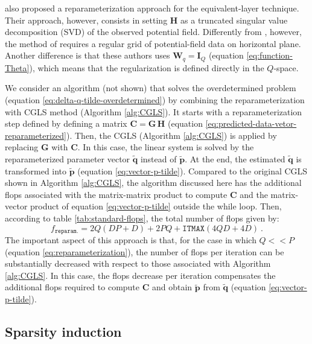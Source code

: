 \documentclass[utf8]{FrontiersinHarvard} %
\begin{document}
	\cite{mendonca2020} also proposed a reparameterization approach for the equivalent-layer technique.
	Their approach, however, consists in setting $\mathbf{H}$ as a truncated singular value decomposition
	(SVD) \cite[e.g.,][p. 55]{aster_etal2019} of the observed potential field. 
	Differently from \cite{oliveirajr-etal2013}, however, the method of \cite{mendonca2020} requires 
	a regular grid of potential-field data on horizontal plane.
	Another difference is that these authors uses $\mathbf{W}_{q} = \mathbf{I}_{Q}$ (equation \ref{eq:function-Theta}),
	which means that the regularization is defined directly in the $Q$-space.
	
	We consider an algorithm (not shown) that solves the overdetermined problem (equation \ref{eq:delta-q-tilde-overdetermined}) by
	combining the reparameterization with CGLS method (Algorithm \ref{alg:CGLS}).
	It starts with a reparameterization step defined by defining a matrix $\mathbf{C} = \mathbf{G \, H}$ 
	(equation \ref{eq:predicted-data-vetor-reparameterized}).
	Then, the CGLS (Algorithm \ref{alg:CGLS}) is applied by replacing $\mathbf{G}$ with $\mathbf{C}$.
	In this case, the linear system is solved by the reparameterized parameter vector $\tilde{\mathbf{q}}$ instead of
	$\tilde{\mathbf{p}}$. At the end, the estimated $\tilde{\mathbf{q}}$ is transformed into $\tilde{\mathbf{p}}$ 
	(equation \ref{eq:vector-p-tilde}).
	Compared to the original CGLS shown in Algorithm \ref{alg:CGLS}, the algorithm discussed here has the additional flops
	associated with the matrix-matrix product to compute $\mathbf{C}$ and the matrix-vector product of equation \ref{eq:vector-p-tilde} outside the while loop.
	Then, according to table \ref{tab:standard-flops}, the total number of flops given by:
	\begin{equation}
		f_{\mathtt{reparam.}} = 2Q(DP+D) + 2PQ + \mathtt{ITMAX} \left( 4QD + 4D \right) \: .
		\label{flops:reparameterization-cgls}
	\end{equation}
	The important aspect of this approach is that, for the case in which $Q << P$ (equation \ref{eq:reparameterization}),
	the number of flops per iteration can be substantially decreased with respect to those associated with Algorithm \ref{alg:CGLS}.
	In this case, the flops decrease per iteration compensates the additional flops required to compute $\mathbf{C}$ and 
	obtain $\tilde{\mathbf{p}}$ from $\tilde{\mathbf{q}}$ (equation \ref{eq:vector-p-tilde}).
	
	\subsection{Sparsity induction}
	
\end{document}
